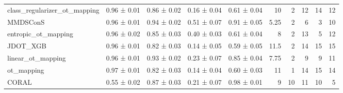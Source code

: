 \begin{tabular}{lllllrrrrr}
 class\_regularizer\_ot\_mapping & 0.96 ± 0.01     & 0.86 ± 0.02       & 0.16 ± 0.04 & 0.61 ± 0.04    &         10    &                    2 &                     12 &              14 &                  12 \\
 MMDSConS                     & 0.96 ± 0.01     & 0.94 ± 0.02       & 0.51 ± 0.07 & 0.91 ± 0.05    &          5.25 &                    2 &                      6 &               3 &                  10 \\
 entropic\_ot\_mapping          & 0.96 ± 0.02     & 0.85 ± 0.03       & 0.40 ± 0.03 & 0.61 ± 0.04    &          8    &                    2 &                     13 &               5 &                  12 \\
 JDOT\_XGB                     & 0.96 ± 0.01     & 0.82 ± 0.03       & 0.14 ± 0.05 & 0.59 ± 0.05    &         11.5  &                    2 &                     14 &              15 &                  15 \\
 linear\_ot\_mapping            & 0.96 ± 0.01     & 0.93 ± 0.02       & 0.23 ± 0.07 & 0.85 ± 0.04    &          7.75 &                    2 &                      9 &               9 &                  11 \\
 ot\_mapping                   & 0.97 ± 0.01     & 0.82 ± 0.03       & 0.14 ± 0.04 & 0.60 ± 0.03    &         11    &                    1 &                     14 &              15 &                  14 \\
 CORAL                        & 0.55 ± 0.02     & 0.87 ± 0.03       & 0.21 ± 0.07 & 0.98 ± 0.01    &          9    &                   10 &                     11 &              10 &                   5 \\
\hline
\end{tabular}